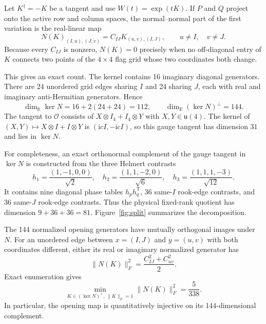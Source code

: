 \documentclass[11pt]{article}
\newcommand{\ii}{\mathrm{i}}
\newcommand{\cO}{\mathcal{O}}
\begin{document}
Let $K^\dagger=-K$ be a tangent and use $W(t)=\exp(tK)$.  If $P$ and $Q$
project onto the active row and column spaces, the normal--normal part of the
first variation is the real-linear map
\begin{equation}
 N(K)_{(I,u),(J,v)}=C_{IJ}K_{(u,v),(I,J)},\qquad
 u\neq I,\quad v\neq J.
 \label{eq:Nmap}
\end{equation}
Because every $C_{IJ}$ is nonzero, $N(K)=0$ precisely when no off-diagonal
entry of $K$ connects two points of the $4\times4$ flag grid whose two
coordinates both change.

This gives an exact count.  The kernel contains 16 imaginary diagonal
generators.  There are 24 unordered grid edges sharing $I$ and 24 sharing
$J$, each with real and imaginary anti-Hermitian generators.  Hence
\begin{equation}
 \dim_{\mathbb R}\ker N=16+2(24+24)=112,
 \qquad \dim_{\mathbb R}(\ker N)^\perp=144.
 \label{eq:split}
\end{equation}
The tangent to $\cO$ consists of $X\otimes I_4+I_4\otimes Y$ with
$X,Y\in\mathfrak u(4)$.  The kernel of $(X,Y)\mapsto X\otimes I+I\otimes Y$
is $(\ii cI,-\ii cI)$, so this gauge tangent has dimension $31$ and lies in
$\ker N$.

For completeness, an exact orthonormal complement of the gauge tangent in
$\ker N$ is constructed from the three Helmert contrasts
\begin{equation}
 h_1=\frac{(1,-1,0,0)}{\sqrt2},\quad
 h_2=\frac{(1,1,-2,0)}{\sqrt6},\quad
 h_3=\frac{(1,1,1,-3)}{\sqrt{12}}.
 \label{eq:helmert}
\end{equation}
It contains nine diagonal phase tables $h_p h_q^{\mathsf T}$, 36
same-$I$ rook-edge contrasts, and 36 same-$J$ rook-edge contrasts.  Thus the
physical fixed-rank quotient has dimension $9+36+36=81$.  Figure~\ref{fig:split}
summarizes the decomposition.



The 144 normalized opening generators have mutually orthogonal images under
$N$.  For an unordered edge between $x=(I,J)$ and $y=(u,v)$ with both
coordinates different, either its real or imaginary normalized generator has
\begin{equation}
 \lVert N(K)\rVert_F^2=\frac{C_{IJ}^2+C_{uv}^2}{2}.
 \label{eq:opening-scale}
\end{equation}
Exact enumeration gives
\begin{equation}
 \min_{K\in(\ker N)^\perp,\,\lVert K\rVert_F=1}
 \lVert N(K)\rVert_F^2=\frac{5}{338}.
 \label{eq:opening-gap}
\end{equation}
In particular, the opening map is quantitatively injective on its
144-dimensional complement.
\end{document}

